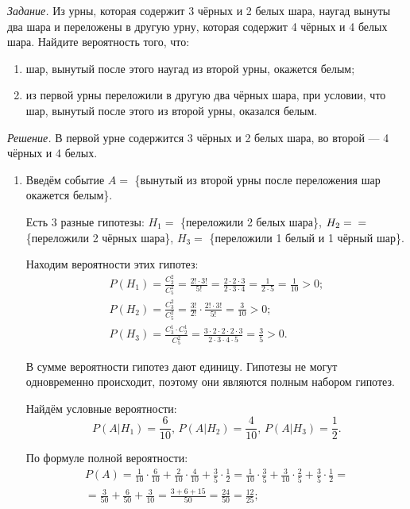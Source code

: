 \textit{Задание.} Из урны, которая содержит 3 чёрных и 2 белых шара, наугад вынуты два шара и переложены в другую урну, которая содержит 4 чёрных и 4 белых шара.
Найдите вероятность того, что:
\begin{enumerate}[label=\alph*)]
\item шар, вынутый после этого наугад из второй урны, окажется белым;
\item из первой урны переложили в другую два чёрных шара, при условии, что шар, вынутый после этого из второй урны, оказался белым.
\end{enumerate}

\textit{Решение.} В первой урне содержится 3 чёрных и 2 белых шара, во второй --- 4 чёрных и 4 белых.
\begin{enumerate}[label=\alph*)]
\item Введём событие $A =$ \{вынутый из второй урны после переложения шар окажется белым\}.

Есть 3 разные гипотезы: $H_1 =$ \{переложили 2 белых шара\}, $H_2 = \\ =$ \{переложили 2 чёрных шара\}, $H_3 =$ \{переложили 1 белый и 1 чёрный шар\}.

Находим вероятности этих гипотез:
\begin{equation*}
\begin{split}
P \left( H_1 \right) =
\frac{C_2^2}{C_5^2} =
\frac{2! \cdot 3!}{5!} = 
\frac{2 \cdot 2 \cdot 3}{2 \cdot 3 \cdot 4} =
\frac{1}{2 \cdot 5} =
\frac{1}{10} >
0; \\
P \left( H_2 \right) =
\frac{C_3^2}{C_5^2} =
\frac{3!}{2!} \cdot \frac{2! \cdot 3!}{5!} =
\frac{3}{10} >
0; \\
P \left( H_3 \right) =
\frac{C_3^1 \cdot C_2^1}{C_5^2} =
\frac{3 \cdot 2 \cdot 2 \cdot 2 \cdot 3}{2 \cdot 3 \cdot 4 \cdot 5} =
\frac{3}{5} >
0.
\end{split}
\end{equation*}

В сумме вероятности гипотез дают единицу.
Гипотезы не могут одновременно происходит, поэтому они являются полным набором гипотез.

Найдём условные вероятности:
$$P \left( \left. A \right| H_1 \right) =
\frac{6}{10}, \,
P \left( \left. A \right| H_2 \right) =
\frac{4}{10}, \,
P \left( \left. A \right| H_3 \right) =
\frac{1}{2}.$$

По формуле полной вероятности:
\begin{equation*}
\begin{split}
P \left( A \right) =
\frac{1}{10} \cdot \frac{6}{10} + \frac{2}{10} \cdot \frac{4}{10} + \frac{3}{5} \cdot \frac{1}{2} =
\frac{1}{10} \cdot \frac{3}{5} + \frac{3}{10} \cdot \frac{2}{5} + \frac{3}{5} \cdot \frac{1}{2} = \\
= \frac{3}{50} + \frac{6}{50} + \frac{3}{10} =
\frac{3+6+15}{50} =
\frac{24}{50} =
\frac{12}{25};
\end{split}
\end{equation*}


\end{enumerate}
